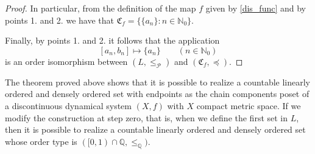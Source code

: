 \documentclass[pdflatex,sn-mathphys-num]{sn-jnl}
\theoremstyle{thmstyleone}%
\theoremstyle{thmstyletwo}%
\theoremstyle{thmstylethree}%
\begin{document}
\begin{proof}
\noindent In particular, from the definition of the map $f$ given by \eqref{dis_func} and by points 1. and 2. we have that
$
\mathfrak{C}_f=
\{\{a_n\}:n\in\mathbb{N}_0\}
$.

\noindent Finally, by points 1. and 2. it follows that the application
$$
[a_n,b_n]\mapsto \{a_n\} \qquad (n\in\mathbb{N}_0)
$$
is an order isomorphism between $(L,\le_\mathcal{P})$ and $(\mathfrak{C}_f,\preceq)$.
\end{proof}



\noindent The theorem proved above shows that it is possible to realize a countable linearly ordered and densely ordered set with endpoints as the chain components poset of a discontinuous dynamical system $(X,f)$ with $X$ compact metric space.
If we modify the construction at step zero, that is, when we define the first set in $L$, then it is possible to realize a countable linearly ordered and densely ordered set whose order type is $([0,1)\cap\mathbb{Q}, \leq_{\mathbb{Q}})$.
\end{document}

